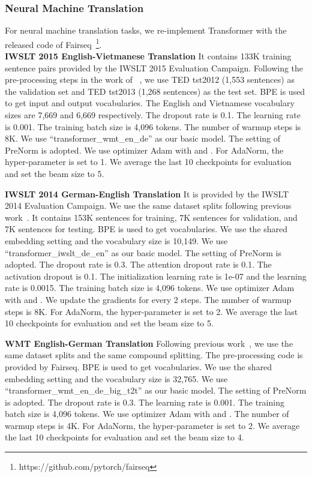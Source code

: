 \documentclass{article}
\begin{document}
\subsubsection{Neural Machine Translation}
For neural machine translation tasks, we re-implement Transformer with the released code of Fairseq~\citep{ott2019fairseq}\footnote{https://github.com/pytorch/fairseq}.  \\\textbf{IWSLT 2015 English-Vietmanese Translation} It contains 133K training
sentence pairs provided by the IWSLT 2015 Evaluation Campaign. Following
the pre-processing steps in the work of ~\cite{DBLP:conf/icml/RaffelLLWE17}, we use TED
tst2012 (1,553 sentences) as the validation set  and TED tst2013 (1,268 sentences)
as the test set. BPE is used to get input and output vocabularies. The English and Vietnamese vocabulary sizes are 7,669 and 6,669 respectively.  The dropout rate is 0.1. The learning rate is 0.001. The training batch size is  4,096 tokens. The number of warmup steps is 8K. We use ``transformer\_wmt\_en\_de'' as our basic model. The setting of PreNorm is adopted. We use optimizer Adam with  and .   For AdaNorm, the hyper-parameter  is set to 1.
We average the last 10 checkpoints for evaluation and set the beam size to 5. 

\textbf{IWSLT 2014 German-English Translation} It is provided by the IWSLT 2014 Evaluation Campaign.  We use the same dataset splits following previous work~\citep{ott2019fairseq,DBLP:journals/corr/RanzatoCAZ15,DBLP:conf/emnlp/WisemanR16}. It contains 153K sentences for training, 7K sentences for validation, and 7K sentences for testing. BPE is used to get vocabularies. We use the shared embedding setting and the vocabulary size is 10,149. We use ``transformer\_iwslt\_de\_en'' as our basic model. The setting of PreNorm is adopted.   The dropout rate is 0.3. The attention dropout rate is  0.1. The activation dropout is 0.1. The initialization learning rate is 1e-07 and the learning rate is 0.0015. The training batch size is  4,096 tokens. We use optimizer Adam with  and .  We  update the gradients for every 2 steps. The number of warmup steps is 8K. For AdaNorm, the hyper-parameter  is set to 2. We average the last 10 checkpoints for evaluation and set the beam size to 5. 



\textbf{WMT English-German Translation} Following previous work~\citep{DBLP:conf/nips/VaswaniSPUJGKP17}, we use the same dataset splits and the same compound splitting.  The pre-processing code is provided by Fairseq.  BPE is used to get vocabularies. We use the shared embedding setting and the vocabulary size is 32,765. We use ``transformer\_wmt\_en\_de\_big\_t2t'' as our basic model. The setting of PreNorm is adopted.   The dropout rate is 0.3. The learning rate is 0.001. The training batch size is  4,096 tokens. We use optimizer Adam with  and .  The number of warmup steps is 4K. For AdaNorm, the hyper-parameter  is set to 2. We average the last 10 checkpoints for evaluation and set the beam size to 4.  
\end{document}
